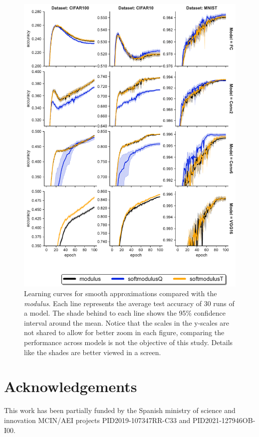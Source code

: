 \documentclass[authoryear]{elsarticle}
\begin{document}
\begin{figure}[h!]
	\centering
	\includegraphics[width=1.0\linewidth]{figs/training_curves_smooth}
	\caption{Learning curves for smooth approximations compared with the \textit{modulus}. Each line represents the average test accuracy of 30 runs of a model. The shade behind to each line shows the 95\% confidence interval around the mean. Notice that the scales in the y-scales are not shared to allow for better zoom in each figure, comparing the performance across models is not the objective of this study. Details like the shades are better viewed in a screen.}
	\label{fig:training_curves_smooth}
\end{figure}

\section{Acknowledgements}
This work has been partially funded by the Spanish ministry of science and innovation MCIN/AEI projects PID2019-107347RR-C33 and PID2021-127946OB-I00.
\end{document}
